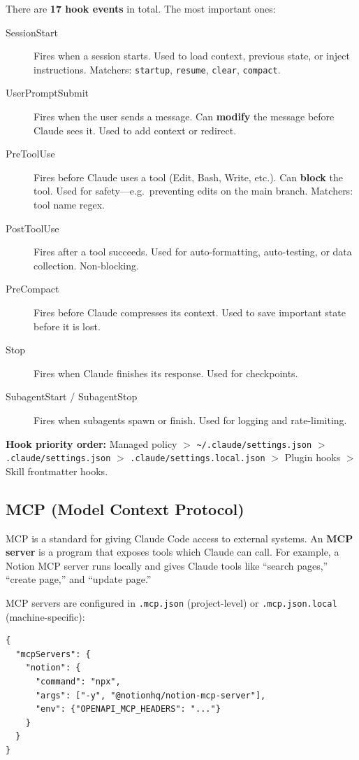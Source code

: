 \documentclass[11pt,a4paper]{article}
\begin{document}
There are \textbf{17 hook events} in total. The most important ones:

\begin{description}
  \item[SessionStart] Fires when a session starts. Used to load context, previous state, or inject instructions. Matchers: \texttt{startup}, \texttt{resume}, \texttt{clear}, \texttt{compact}.
  \item[UserPromptSubmit] Fires when the user sends a message. Can \textbf{modify} the message before Claude sees it. Used to add context or redirect.
  \item[PreToolUse] Fires before Claude uses a tool (Edit, Bash, Write, etc.). Can \textbf{block} the tool. Used for safety---e.g.\ preventing edits on the main branch. Matchers: tool name regex.
  \item[PostToolUse] Fires after a tool succeeds. Used for auto-formatting, auto-testing, or data collection. Non-blocking.
  \item[PreCompact] Fires before Claude compresses its context. Used to save important state before it is lost.
  \item[Stop] Fires when Claude finishes its response. Used for checkpoints.
  \item[SubagentStart / SubagentStop] Fires when subagents spawn or finish. Used for logging and rate-limiting.
\end{description}

\textbf{Hook priority order:} Managed policy $>$ \texttt{\textasciitilde/.claude/settings.json} $>$ \texttt{.claude/settings.json} $>$ \texttt{.claude/settings.local.json} $>$ Plugin hooks $>$ Skill frontmatter hooks.

\subsection{MCP (Model Context Protocol)}
\label{sec:mcp}

MCP is a standard for giving Claude Code access to external systems. An \textbf{MCP server} is a program that exposes tools which Claude can call. For example, a Notion MCP server runs locally and gives Claude tools like ``search pages,'' ``create page,'' and ``update page.''

MCP servers are configured in \texttt{.mcp.json} (project-level) or \texttt{.mcp.json.local} (machine-specific):

\begin{lstlisting}
{
  "mcpServers": {
    "notion": {
      "command": "npx",
      "args": ["-y", "@notionhq/notion-mcp-server"],
      "env": {"OPENAPI_MCP_HEADERS": "..."}
    }
  }
}
\end{lstlisting}
\end{document}
